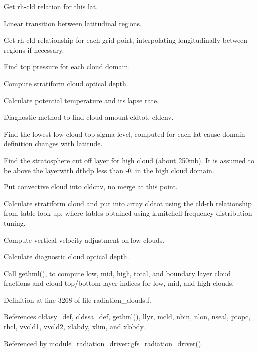\begin{DoxyEnumerate}
\item Get rh-\/cld relation for this lat.
\item Linear transition between latitudinal regions.
\item Get rh-\/cld relationship for each grid point, interpolating longitudinally between regions if necessary.
\item Find top pressure for each cloud domain.
\item Compute stratiform cloud optical depth.
\item Calculate potential temperature and its lapse rate.
\item Diagnostic method to find cloud amount cldtot, cldcnv.
\begin{DoxyItemize}
\item Find the lowest low cloud top sigma level, computed for each lat cause domain definition changes with latitude.
\item Find the stratosphere cut off layer for high cloud (about 250mb). It is assumed to be above the layerwith dthdp less than -\/0. in the high cloud domain.
\item Put convective cloud into \textquotesingle{}cldcnv\textquotesingle{}, no merge at this point.
\item Calculate stratiform cloud and put into array \textquotesingle{}cldtot\textquotesingle{} using the cld-\/rh relationship from table look-\/up, where tables obtained using k.\+mitchell frequency distribution tuning.
\item Compute vertical velocity adjustment on low clouds.
\item Calculate diagnostic cloud optical depth.
\end{DoxyItemize}
\item Call \hyperlink{group__module__radiation__clouds_gac231d967afcfb252dedba82e9085b34d}{gethml()}, to compute low, mid, high, total, and boundary layer cloud fractions and cloud top/bottom layer indices for low, mid, and high clouds. 
\end{DoxyEnumerate}

Definition at line 3268 of file radiation\+\_\+clouds.\+f.



References cldasy\+\_\+def, cldssa\+\_\+def, gethml(), llyr, mcld, nbin, nlon, nseal, ptopc, rhcl, vvcld1, vvcld2, xlabdy, xlim, and xlobdy.



Referenced by module\+\_\+radiation\+\_\+driver\+::gfs\+\_\+radiation\+\_\+driver().

